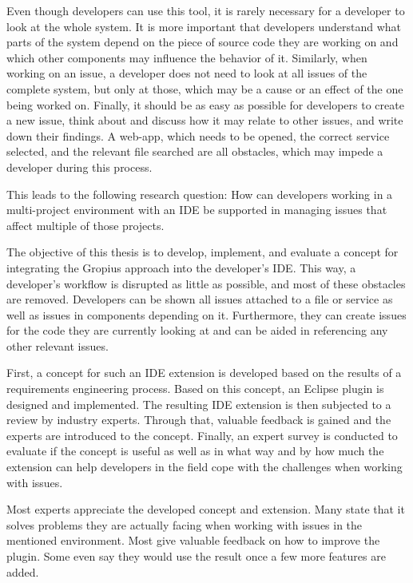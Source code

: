 Even though developers can use this tool, it is rarely necessary for a developer to look at the whole system. 
It is more important that developers understand what parts of the system depend on the piece of source code they are working on and which other components may influence the behavior of it. 
Similarly, when working on an issue, a developer does not need to look at all issues of the complete system, but only at those, which may be a cause or an effect of the one being worked on. 
Finally, it should be as easy as possible for developers to create a new issue, think about and discuss how it may relate to other issues, and write down their findings.
A web-app,  which needs to be opened, the correct service selected, and the relevant file searched are all obstacles, which may impede a developer during this process. 

This leads to the following research question: How can developers working in a multi-project environment with an \gls{IDE} be supported in managing issues that affect multiple of those projects.

The objective of this thesis is to develop, implement, and evaluate a concept for integrating the \gls{Gropius} approach into the developer's \gls{IDE}.
This way, a developer's workflow is disrupted as little as possible, and most of these obstacles are removed.
Developers can be shown all issues attached to a file or service as well as issues in components depending on it.
Furthermore, they can create issues for the code they are currently looking at and can be aided in referencing any other relevant issues.

First, a concept for such an \gls{IDE} extension is developed based on the results of a requirements engineering process.
Based on this concept, an \gls{Eclipse} plugin is designed and implemented.
The resulting \gls{IDE} extension is then subjected to a review by industry experts.
Through that, valuable feedback is gained and the experts are introduced to the concept.
Finally, an expert survey is conducted to evaluate if the concept is useful 
as well as in what way and by how much the extension can help developers in the field cope with the challenges when working with issues.

Most experts appreciate the developed concept and extension.
Many state that it solves problems they are actually facing when working with issues in the mentioned environment.
Most give valuable feedback on how to improve the plugin.
Some even say they would use the result once a few more features are added.

